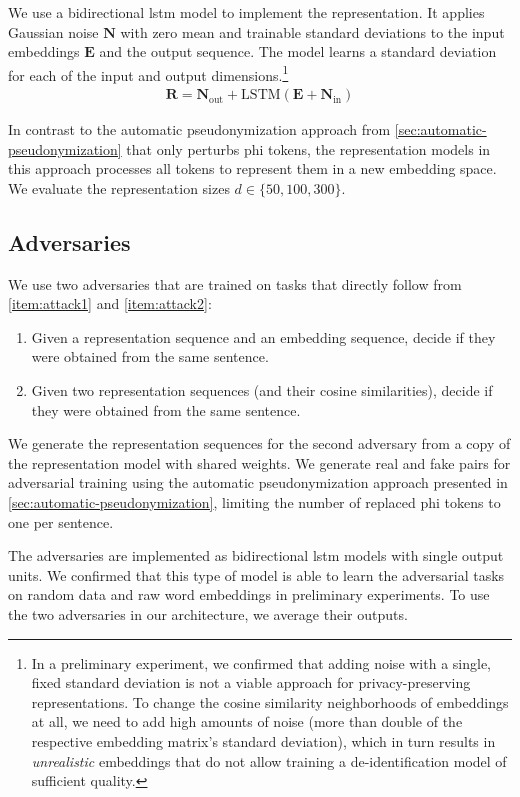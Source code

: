 %
We use a bidirectional \ac{lstm} model to implement the representation.
%
It applies Gaussian noise $\bm{N}$ with zero mean and trainable standard deviations to the input embeddings $\bm{E}$ and the output sequence.
%
The model learns a standard deviation for each of the input and output dimensions.\footnote{
    In a preliminary experiment, we confirmed that adding noise with a single, fixed standard deviation is not a viable approach for privacy-preserving representations.
    To change the cosine similarity neighborhoods of embeddings at all, we need to add high amounts of noise (more than double of the respective embedding matrix's standard deviation), which in turn results in \emph{unrealistic} embeddings that do not allow training a de-identification model of sufficient quality.
}
%
\begin{align}
\bm{R} = \bm{N}_{\text{out}} + \text{LSTM}(\bm{E} + \bm{N}_{\text{in}})
\end{align}

%
In contrast to the automatic pseudonymization approach from \cref{sec:automatic-pseudonymization} that only perturbs \ac{phi} tokens, the representation models in this approach processes all tokens to represent them in a new embedding space.
%
We evaluate the representation sizes $d \in \{50, 100, 300\}$. 

\subsection{Adversaries}
%
We use two adversaries that are trained on tasks that directly follow from \ref{item:attack1} and \ref{item:attack2}:
\begin{enumerate}[label=T\arabic*.,ref=T\arabic*]
    \item Given a representation sequence and an embedding sequence, decide if they were obtained from the same sentence.
    \item Given two representation sequences (and their cosine similarities), decide if they were obtained from the same sentence.
\end{enumerate}
%
We generate the representation sequences for the second adversary from a copy of the representation model with shared weights.
%
We generate real and fake pairs for adversarial training using the automatic pseudonymization approach presented in \cref{sec:automatic-pseudonymization}, limiting the number of replaced \ac{phi} tokens to one per sentence.

%
The adversaries are implemented as bidirectional \ac{lstm} models with single output units.
%
We confirmed that this type of model is able to learn the adversarial tasks on random data and raw word embeddings in preliminary experiments.
%
To use the two adversaries in our architecture, we average their outputs.

